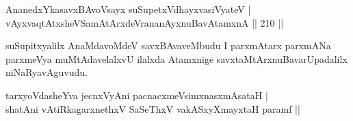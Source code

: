 \begin{shl}
AnanedxYkasavxBAvoV\s sayx suSupetxV\s dhayxvasiVyateV |\\
vAyxvaqtAtxsheVSamAtArxdeVrananAyxnuBavAtamxnA \hfill || 210 ||
\end{shl}

\begin{artha}
suSupitxyalilx AnaMdavoMdeV savxBAvaveMbudu I parxmAtarx parxmANa parxmeVya muMtAdavelalxvU ilalxda Atamxnige savxtaMtArxnuBavarUpadalilx niNaRyavAguvudu.
\end{artha}


\begin{shl}
tarxyoVdasheYva jecnxVyAni pacnacxmeV\s simxnasxmAsataH |\\
shatAni vAtiRkagarxnethxV SaSeThxV vakASxyXmayxtaH paramf ||
\end{shl}

